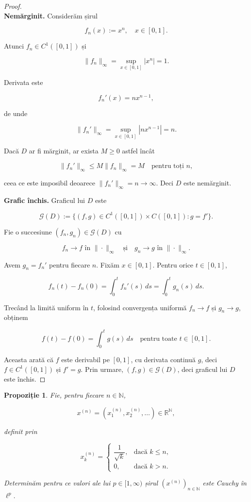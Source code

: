 \documentclass[12pt]{article}
\theoremstyle{definition}
\theoremstyle{plain}
\newtheorem{proposition}{Propoziție}
\begin{document}
\begin{proof}
\textbf{\\Nemărginit.} Considerăm șirul


\[
f_n(x) := x^n, \quad x \in [0,1].
\]


Atunci $f_n \in C^1([0,1])$ și


\[
\|f_n\|_\infty = \sup_{x \in [0,1]} |x^n| = 1.
\]


Derivata este


\[
f_n'(x) = n x^{n-1},
\]


de unde


\[
\|f_n'\|_\infty = \sup_{x \in [0,1]} |n x^{n-1}| = n.
\]


Dacă $D$ ar fi mărginit, ar exista $M \ge 0$ astfel încât


\[
\|f_n'\|_\infty \le M \|f_n\|_\infty = M \quad \text{pentru toți } n,
\]


ceea ce este imposibil deoarece $\|f_n'\|_\infty = n \to \infty$. Deci $D$ este nemărginit.

\medskip

\textbf{Grafic închis.} Graficul lui $D$ este


\[
\mathcal{G}(D) := \{ (f,g) \in C^1([0,1]) \times C([0,1]) : g = f' \}.
\]


Fie o succesiune $(f_n,g_n) \in \mathcal{G}(D)$ cu


\[
f_n \to f \text{ în } \|\cdot\|_\infty \quad \text{și} \quad g_n \to g \text{ în } \|\cdot\|_\infty.
\]


Avem $g_n = f_n'$ pentru fiecare $n$. Fixăm $x \in [0,1]$. Pentru orice $t \in [0,1]$,


\[
f_n(t) - f_n(0) = \int_0^t f_n'(s)\,ds = \int_0^t g_n(s)\,ds.
\]


Trecând la limită uniform în $t$, folosind convergența uniformă $f_n \to f$ și $g_n \to g$, obținem


\[
f(t) - f(0) = \int_0^t g(s)\,ds \quad \text{pentru toate } t \in [0,1].
\]


Aceasta arată că $f$ este derivabil pe $[0,1]$, cu derivata continuă $g$, deci $f \in C^1([0,1])$ și $f' = g$. Prin urmare, $(f,g) \in \mathcal{G}(D)$, deci graficul lui $D$ este închis.
\end{proof}

\begin{proposition}
Fie, pentru fiecare $n \in \mathbb{N}$,


\[
x^{(n)} = (x^{(n)}_1, x^{(n)}_2, \dots) \in \mathbb{R}^{\mathbb{N}},
\]


definit prin


\[
x^{(n)}_k =
\begin{cases}
\dfrac{1}{\sqrt{k}}, & \text{dacă } k \le n,\\[4pt]
0, & \text{dacă } k > n.
\end{cases}
\]


Determinăm pentru ce valori ale lui $p \in [1,\infty)$ șirul $(x^{(n)})_{n\in\mathbb{N}}$ este Cauchy în $\ell^p$.
\end{proposition}
\end{document}
